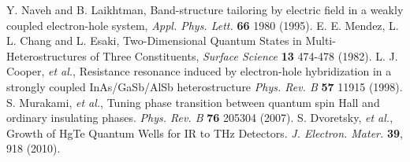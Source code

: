 \documentclass[titlepage,a4paper]{book}
\begin{document}
\begin{thebibliography}{99}
Y. Naveh and B. Laikhtman, Band-structure tailoring by electric field in a weakly coupled electron-hole system, \textit{Appl. Phys. Lett.} \textbf{66} 1980 (1995).
E. E. Mendez, L. L. Chang and L. Esaki, Two-Dimensional Quantum States in Multi-Heterostructures of Three Constituents, \textit{Surface Science} \textbf{13} 474-478 (1982).
L. J. Cooper, \textit{et al.}, Resistance resonance induced by electron-hole hybridization in a strongly coupled InAs/GaSb/AlSb heterostructure \textit{Phys. Rev. B} \textbf{57} 11915 (1998).
S. Murakami, \textit{et al.}, Tuning phase transition between quantum spin Hall and ordinary insulating phases. \textit{Phys. Rev. B} \textbf{76} 205304 (2007).
S. Dvoretsky, \textit{et al.}, Growth of HgTe Quantum Wells for IR to THz Detectors. \textit{J. Electron. Mater.} \textbf{39}, 918 (2010). 



\end{thebibliography}
\end{document}
